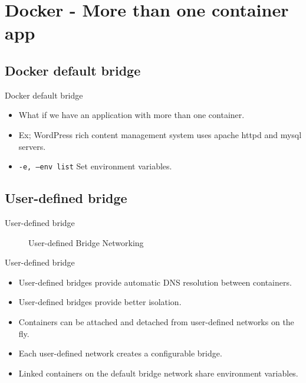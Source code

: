 
\section{Docker - More than one container app}\label{sec:more-than-one-container-app}

\subsection{Docker default bridge}\label{subsec:docker-default-bridge}
\begin{frame}{Docker default bridge}
    \begin{itemize}
        \item What if we have an application with more than one container.
        \item Ex; WordPress rich content management system uses apache httpd and mysql servers.
        \item \texttt{-e, --env list} Set environment variables.
        
    \end{itemize}
\end{frame}

\subsection{User-defined bridge}\label{subsec:user-defined-bridge}
\begin{frame}{User-defined bridge}
    \begin{figure}[!t]
        \raggedright
        
        \caption{User-defined Bridge Networking}
    \end{figure}
\end{frame}
\begin{frame}{User-defined bridge}
    \begin{itemize}
        \item User-defined bridges provide automatic DNS resolution between containers.
        \item User-defined bridges provide better isolation.
        \item Containers can be attached and detached from user-defined networks on the fly.
        \item Each user-defined network creates a configurable bridge.
        \item Linked containers on the default bridge network share environment variables.
    \end{itemize}
\end{frame}

